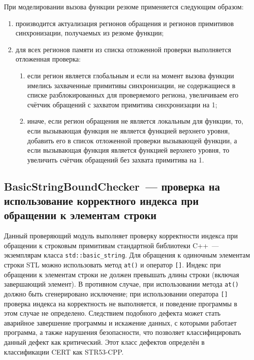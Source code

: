 При моделировании вызова функции резюме применяется следующим образом:

\begin{enumerate}
 \item производится актуализация регионов обращения и регионов примитивов синхронизации, получаемых из резюме функции;
 \item для всех регионов памяти из списка отложенной проверки выполняется отложенная проверка:
 \begin{enumerate}
 \item если регион является глобальным и если на момент вызова функции имелись захваченные примитивы синхронизации, не содержащиеся в списке разблокированных для проверяемого региона, увеличиваем его счётчик обращений с захватом примитива синхронизации на 1;
 \item иначе, если регион обращения не является локальным для функции, то, если вызывающая функция не является функцией верхнего уровня, добавить его в список отложенной проверки вызывающей функции, а если вызывающая функция является функцией верхнего уровня, то увеличить счётчик обращений без захвата примитива на 1.
 \end{enumerate}
\end{enumerate}



\subsection{BasicStringBoundChecker~--- проверка на использование корректного индекса при обращении к элементам строки} \label{sect:basic_string}

Данный проверяющий модуль выполняет проверку корректности индекса при обращении к строковым примитивам стандартной библиотеки C++~--- экземплярам класса \texttt{std::basic\_string}. Для обращения к одиночным элементам строки STL можно использовать метод \texttt{at()} и оператор \texttt{[]}. Индекс при обращении к элементам строки не должен превышать длины строки (включая завершающий элемент). В противном случае, при использовании метода \texttt{at()} должно быть сгенерировано исключение; при использовании оператора \texttt{[]} проверка индекса на корректность не выполняется, и поведение программы в этом случае не определено. Следствием подобного дефекта может стать аварийное завершение программы и искажение данных, с которыми работает программа, а также нарушения безопасности, что позволяет классифицировать данный дефект как критический. Этот класс дефектов определён в классификации CERT как STR53-CPP.

